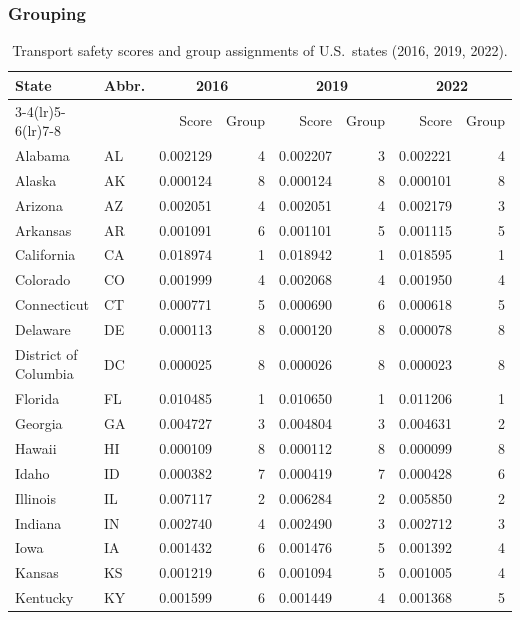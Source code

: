 \documentclass{article}
\begin{document}
\subsubsection{Grouping}
\begin{table}[H]
\centering
\caption{Transport safety scores and group assignments of U.S.\ states (2016, 2019, 2022).\label{tab:grouping}}
\scriptsize
\setlength{\tabcolsep}{3pt}
\begin{tabular}{llrrrrrr}
\toprule
\multirow{2}{*}{State} & \multirow{2}{*}{Abbr.} & \multicolumn{2}{c}{2016} & \multicolumn{2}{c}{2019} & \multicolumn{2}{c}{2022} \\
\cmidrule(lr){3-4}\cmidrule(lr){5-6}\cmidrule(lr){7-8}
 & & Score & Group & Score & Group & Score & Group \\
\midrule
Alabama & AL & 0.002129 & 4 & 0.002207 & 3 & 0.002221 & 4 \\
Alaska & AK & 0.000124 & 8 & 0.000124 & 8 & 0.000101 & 8 \\
Arizona & AZ & 0.002051 & 4 & 0.002051 & 4 & 0.002179 & 3 \\
Arkansas & AR & 0.001091 & 6 & 0.001101 & 5 & 0.001115 & 5 \\
California & CA & 0.018974 & 1 & 0.018942 & 1 & 0.018595 & 1 \\
Colorado & CO & 0.001999 & 4 & 0.002068 & 4 & 0.001950 & 4 \\
Connecticut & CT & 0.000771 & 5 & 0.000690 & 6 & 0.000618 & 5 \\
Delaware & DE & 0.000113 & 8 & 0.000120 & 8 & 0.000078 & 8 \\
District of Columbia & DC & 0.000025 & 8 & 0.000026 & 8 & 0.000023 & 8 \\
Florida & FL & 0.010485 & 1 & 0.010650 & 1 & 0.011206 & 1 \\
Georgia & GA & 0.004727 & 3 & 0.004804 & 3 & 0.004631 & 2 \\
Hawaii & HI & 0.000109 & 8 & 0.000112 & 8 & 0.000099 & 8 \\
Idaho & ID & 0.000382 & 7 & 0.000419 & 7 & 0.000428 & 6 \\
Illinois & IL & 0.007117 & 2 & 0.006284 & 2 & 0.005850 & 2 \\
Indiana & IN & 0.002740 & 4 & 0.002490 & 3 & 0.002712 & 3 \\
Iowa & IA & 0.001432 & 6 & 0.001476 & 5 & 0.001392 & 4 \\
Kansas & KS & 0.001219 & 6 & 0.001094 & 5 & 0.001005 & 4 \\
Kentucky & KY & 0.001599 & 6 & 0.001449 & 4 & 0.001368 & 5 \\

\end{tabular}
\end{table}
\end{document}
